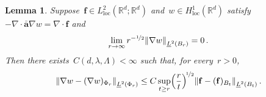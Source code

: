 \documentclass[11pt,twoside]{article} %
\numberwithin{equation}{section}
\newtheorem{lemma}[theorem]{Lemma}
\theoremstyle{definition}
\let\originalleft\left
\let\originalright\right
\renewcommand{\left}{\mathopen{}\mathclose\bgroup\originalleft}
\renewcommand{\right}{\aftergroup\egroup\originalright}
\newcommand*{\R}{\ensuremath{\mathbb{R}}}
\newcommand{\f}{\mathbf{f}}
\renewcommand{\a}{\mathbf{a}}
\newcommand{\ahom}{\bar{\a}}
\begin{document}
\begin{lemma} \label{l.harmdecay}
Suppose~$\f\in  L_{\mathrm{loc}}^2(\R^d ; \R^d)$ and~$w \in H_{\mathrm{loc}}^1(\R^d)$ satisfy~$-\nabla \cdot \ahom \nabla w = \nabla \cdot \f$ and
\begin{align}  \label{e.harmdecay.ass}
\lim_{r \to \infty} r^{-\nicefrac12}
\left\| \nabla w \right\|_{\underline{L}^2 \left( B_{r} \right)} = 0
 \,.
\end{align}
Then there exists~$C(d,\lambda,\Lambda)<\infty$ such that, for every~$r>0$, 
\begin{align}  \label{e.harmdecay}
\left\| \nabla w  -  (\nabla w)_{\Phi_r} \right\|_{\underline{L}^2 \left( \Phi_{r} \right)}  
\leq 
C \sup_{t \geq r}  \Bigl( \frac{r}{t} \Bigr)^{\!\nicefrac12} \left\| \f - (\f)_{B_t}  \right\|_{\underline{L}^2 \left( B_{t} \right)}  \,.
\end{align}
\end{lemma}
\end{document}
